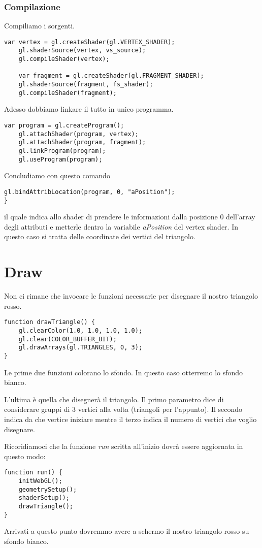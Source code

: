 \subsubsection{Compilazione}
Compiliamo i sorgenti.
\begin{lstlisting}[style=javascript-style, firstnumber=14]
	var vertex = gl.createShader(gl.VERTEX_SHADER);
	gl.shaderSource(vertex, vs_source);
	gl.compileShader(vertex);

	var fragment = gl.createShader(gl.FRAGMENT_SHADER);
	gl.shaderSource(fragment, fs_shader);
	gl.compileShader(fragment);
\end{lstlisting}
\newpage
Adesso dobbiamo linkare il tutto in unico programma.
\begin{lstlisting}[style=javascript-style, firstnumber=21]
	var program = gl.createProgram();
	gl.attachShader(program, vertex);
	gl.attachShader(program, fragment);
	gl.linkProgram(program);
	gl.useProgram(program);
\end{lstlisting}
Concludiamo con questo comando
\begin{lstlisting}[style=javascript-style, firstnumber=26]
	gl.bindAttribLocation(program, 0, "aPosition");
}
\end{lstlisting}
il quale indica allo shader di prendere le informazioni dalla posizione 0 dell'array degli
attributi e metterle dentro la variabile \emph{aPosition} del vertex shader. In questo caso
si tratta delle coordinate dei vertici del triangolo.

\section{Draw}
Non ci rimane che invocare le funzioni necessarie per disegnare il nostro triangolo rosso.
\begin{lstlisting}[style=javascript-style]
function drawTriangle() {
	gl.clearColor(1.0, 1.0, 1.0, 1.0);
	gl.clear(COLOR_BUFFER_BIT);
	gl.drawArrays(gl.TRIANGLES, 0, 3);
}
\end{lstlisting}
Le prime due funzioni colorano lo sfondo. In questo caso otterremo lo sfondo bianco.

L'ultima \`e quella che disegner\`a il triangolo. Il primo parametro dice di considerare
gruppi di 3 vertici alla volta (triangoli per l'appunto). Il secondo indica da che vertice
iniziare mentre il terzo indica il numero di vertici che voglio disegnare.

Ricoridiamoci che la funzione \emph{run} scritta all'inizio dovr\`a essere aggiornata
in questo modo:
\begin{lstlisting}[style=javascript-style]
function run() {
	initWebGL();
	geometrySetup();
	shaderSetup();
	drawTriangle();
}
\end{lstlisting}
Arrivati a questo punto dovremmo avere a schermo il nostro triangolo rosso su sfondo bianco.